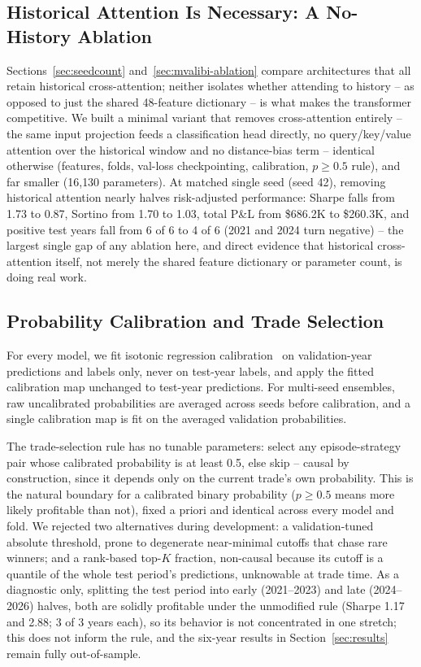 \documentclass[sigconf,review,anonymous]{acmart}
\begin{document}
\subsection{Historical Attention Is Necessary: A No-History Ablation}
\label{sec:nohistory}
Sections~\ref{sec:seedcount} and~\ref{sec:mvalibi-ablation} compare architectures that all retain historical cross-attention; neither isolates whether attending to history -- as opposed to just the shared 48-feature dictionary -- is what makes the transformer competitive. We built a minimal variant that removes cross-attention entirely -- the same input projection feeds a classification head directly, no query/key/value attention over the historical window and no distance-bias term -- identical otherwise (features, folds, val-loss checkpointing, calibration, $p\ge0.5$ rule), and far smaller (16{,}130 parameters). At matched single seed (seed 42), removing historical attention nearly halves risk-adjusted performance: Sharpe falls from 1.73 to 0.87, Sortino from 1.70 to 1.03, total P\&L from \$686.2K to \$260.3K, and positive test years fall from 6 of 6 to 4 of 6 (2021 and 2024 turn negative) -- the largest single gap of any ablation here, and direct evidence that historical cross-attention itself, not merely the shared feature dictionary or parameter count, is doing real work.

\subsection{Probability Calibration and Trade Selection}
\label{sec:calibration}
For every model, we fit isotonic regression calibration~\cite{zadrozny2002transforming} on validation-year predictions and labels only, never on test-year labels, and apply the fitted calibration map unchanged to test-year predictions. For multi-seed ensembles, raw uncalibrated probabilities are averaged across seeds before calibration, and a single calibration map is fit on the averaged validation probabilities.

The trade-selection rule has no tunable parameters: select any episode-strategy pair whose calibrated probability is at least 0.5, else skip -- causal by construction, since it depends only on the current trade's own probability. This is the natural boundary for a calibrated binary probability ($p\ge0.5$ means more likely profitable than not), fixed a priori and identical across every model and fold. We rejected two alternatives during development: a validation-tuned absolute threshold, prone to degenerate near-minimal cutoffs that chase rare winners; and a rank-based top-$K$ fraction, non-causal because its cutoff is a quantile of the whole test period's predictions, unknowable at trade time. As a diagnostic only, splitting the test period into early (2021--2023) and late (2024--2026) halves, both are solidly profitable under the unmodified rule (Sharpe 1.17 and 2.88; 3 of 3 years each), so its behavior is not concentrated in one stretch; this does not inform the rule, and the six-year results in Section~\ref{sec:results} remain fully out-of-sample.
\end{document}
